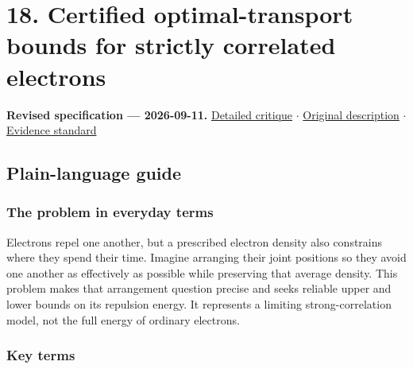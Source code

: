 \documentclass[
  11pt,
]{article}
\begin{document}
\section{18. Certified optimal-transport bounds for strictly correlated
electrons}

\textbf{Revised specification --- 2026-09-11.}
\href{https://github.com/rick-stevens-ai/Pure-Thought/blob/main/reviews/18-Optimal-Transport-Chemistry.md}{Detailed
critique} \ensuremath{\cdot}
\href{https://github.com/rick-stevens-ai/Pure-Thought/blob/main/archive/original-PRDs/18-Optimal-Transport-Chemistry.md}{Original
description} \ensuremath{\cdot}
\href{https://github.com/rick-stevens-ai/Pure-Thought/blob/main/reviews/EVIDENCE-STANDARD.md}{Evidence
standard}

\subsection{Plain-language guide}

\subsubsection{The problem in everyday terms}

Electrons repel one another, but a prescribed electron density also
constrains where they spend their time. Imagine arranging their joint
positions so they avoid one another as effectively as possible while
preserving that average density. This problem makes that arrangement
question precise and seeks reliable upper and lower bounds on its
repulsion energy. It represents a limiting strong-correlation model, not
the full energy of ordinary electrons.

\subsubsection{Key terms}
\end{document}
